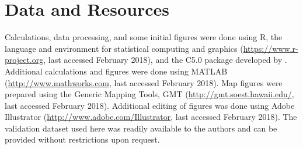 
\section{Data and Resources}

Calculations, data processing, and some initial figures were done using R, the language and environment for statistical computing and graphics (\url{https://www.r-project.org}, last accessed February 2018), and the C5.0 package developed by \citet{Kuhn_2017_Manual}. Additional calculations and figures were done using MATLAB (\url{http://www.mathworks.com}, last accessed February 2018). Map figures were prepared using the Generic Mapping Tools, GMT (\url{http://gmt.soest.hawaii.edu/}, last accessed February 2018). Additional editing of figures was done using Adobe Illustrator (\url{http://www.adobe.com/Illustrator‎}, last accessed February 2018). The validation dataset used here was readily available to the authors and can be provided without restrictions upon request.
